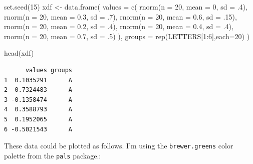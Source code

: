 \documentclass[
  letterpaper,
  DIV=11,
  numbers=noendperiod]{scrreprt}
\newenvironment{Shaded}{\begin{snugshade}}{\end{snugshade}}
\newcommand{\AttributeTok}[1]{\textcolor[rgb]{0.40,0.45,0.13}{#1}}
\newcommand{\DecValTok}[1]{\textcolor[rgb]{0.68,0.00,0.00}{#1}}
\newcommand{\FloatTok}[1]{\textcolor[rgb]{0.68,0.00,0.00}{#1}}
\newcommand{\FunctionTok}[1]{\textcolor[rgb]{0.28,0.35,0.67}{#1}}
\newcommand{\NormalTok}[1]{\textcolor[rgb]{0.00,0.23,0.31}{#1}}
\newcommand{\OtherTok}[1]{\textcolor[rgb]{0.00,0.23,0.31}{#1}}
\newcommand{\SpecialCharTok}[1]{\textcolor[rgb]{0.37,0.37,0.37}{#1}}
\begin{document}
\begin{Shaded}
\begin{Highlighting}[]
\FunctionTok{set.seed}\NormalTok{(}\DecValTok{15}\NormalTok{)}
\NormalTok{xdf }\OtherTok{\textless{}{-}} \FunctionTok{data.frame}\NormalTok{(}
  \AttributeTok{values =} \FunctionTok{c}\NormalTok{(}
\FunctionTok{rnorm}\NormalTok{(}\AttributeTok{n =} \DecValTok{20}\NormalTok{, }\AttributeTok{mean =} \DecValTok{0}\NormalTok{, }\AttributeTok{sd =}\NormalTok{ .}\DecValTok{4}\NormalTok{),}
\FunctionTok{rnorm}\NormalTok{(}\AttributeTok{n =} \DecValTok{20}\NormalTok{, }\AttributeTok{mean =} \FloatTok{0.3}\NormalTok{, }\AttributeTok{sd =}\NormalTok{ .}\DecValTok{7}\NormalTok{),}
\FunctionTok{rnorm}\NormalTok{(}\AttributeTok{n =} \DecValTok{20}\NormalTok{, }\AttributeTok{mean =} \FloatTok{0.6}\NormalTok{, }\AttributeTok{sd =}\NormalTok{ .}\DecValTok{15}\NormalTok{),}
\FunctionTok{rnorm}\NormalTok{(}\AttributeTok{n =} \DecValTok{20}\NormalTok{, }\AttributeTok{mean =} \FloatTok{0.2}\NormalTok{, }\AttributeTok{sd =}\NormalTok{ .}\DecValTok{4}\NormalTok{),}
\FunctionTok{rnorm}\NormalTok{(}\AttributeTok{n =} \DecValTok{20}\NormalTok{, }\AttributeTok{mean =} \FloatTok{0.4}\NormalTok{, }\AttributeTok{sd =}\NormalTok{ .}\DecValTok{4}\NormalTok{),}
\FunctionTok{rnorm}\NormalTok{(}\AttributeTok{n =} \DecValTok{20}\NormalTok{, }\AttributeTok{mean =} \FloatTok{0.7}\NormalTok{, }\AttributeTok{sd =}\NormalTok{ .}\DecValTok{5}\NormalTok{)}
\NormalTok{),}
\AttributeTok{groups =} \FunctionTok{rep}\NormalTok{(LETTERS[}\DecValTok{1}\SpecialCharTok{:}\DecValTok{6}\NormalTok{],}\AttributeTok{each=}\DecValTok{20}\NormalTok{)}
\NormalTok{)}

\FunctionTok{head}\NormalTok{(xdf)}
\end{Highlighting}
\end{Shaded}

\begin{verbatim}
      values groups
1  0.1035291      A
2  0.7324483      A
3 -0.1358474      A
4  0.3588793      A
5  0.1952065      A
6 -0.5021543      A
\end{verbatim}

These data could be plotted as follows. I'm using the
\texttt{brewer.greens} color palette from the \texttt{pals} package.:
\end{document}
